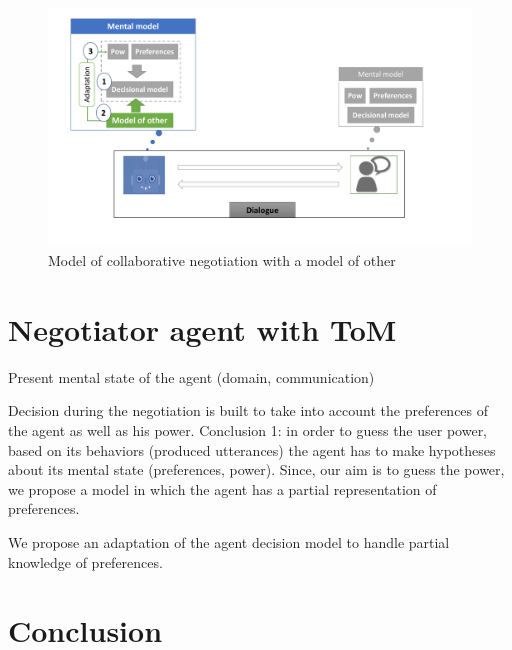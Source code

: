 \documentclass[sigconf]{aamas}  %
\begin{document}
	
	 
	
	
	\begin{figure}
		\includegraphics[width=0.65\linewidth, height= 0.25\textheight]{figs/model_tom.pdf}
		\caption{Model of collaborative negotiation with a model of other} 
		\label{fig:schema-general}
	\end{figure} 


	\section{Negotiator agent with ToM}
		Present mental state of the agent (domain, communication) 
		
		Decision during the negotiation is built to take into account the preferences of the agent as well as his power. 
		Conclusion 1: in order to guess the user power, based on its behaviors (produced utterances) the agent has to make hypotheses about its mental state (preferences, power). Since, our aim is to guess the power, we propose a model in which the agent has a partial representation of preferences. 
		
		We propose an adaptation of the agent decision model to handle partial knowledge of preferences. 
		
	\section{Conclusion}

	
	
	
\end{document}
